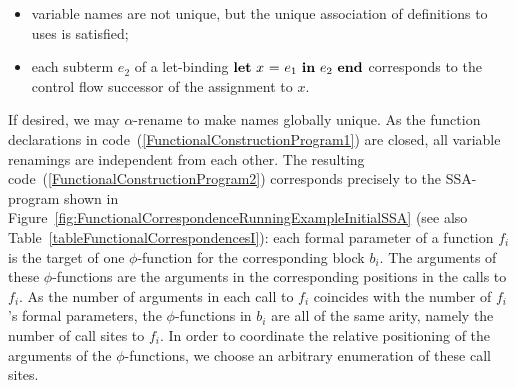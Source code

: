 {\begin{itemize}
\item
  variable names are not unique, but the unique association of
  definitions to uses is satisfied;

\item
  each subterm $e_2$ of a let-binding $\mathbf{let}\ {x}\ \mathbf{=}\ {e_1}\ \mathbf{in}\ {e_2}\ \mathbf{end}$
  corresponds to the control flow successor of the assignment to $x$.

\end{itemize}
If desired, we may $\alpha$-rename to make names globally unique. As
the function declarations in
code~(\ref{FunctionalConstructionProgram1}) are closed, all variable
renamings are independent from each other. The resulting
code~(\ref{FunctionalConstructionProgram2}) corresponds precisely to
the SSA-program shown in
Figure~\ref{fig:FunctionalCorrespondenceRunningExampleInitialSSA} (see
also Table~\ref{tableFunctionalCorrespondencesI}): each formal
parameter of a function $f_i$ is the target of one $\phi$-function for
the corresponding block $b_i$. The arguments of these $\phi$-functions
are the arguments in the corresponding positions in the calls to
$f_i$. As the number of arguments in each call to $f_i$ coincides with
the number of $f_i$'s formal parameters, the $\phi$-functions in $b_i$
are all of the same arity, namely the number of call sites to $f_i$.
In order to coordinate the relative positioning of the arguments of
the $\phi$-functions, we choose an arbitrary enumeration of these call
sites.
\begin{functional}
\label{FunctionalConstructionProgram2}

\end{functional}}
